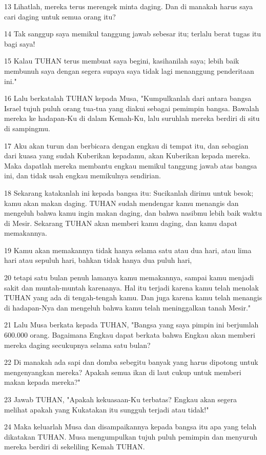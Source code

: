 \par 13 Lihatlah, mereka terus merengek minta daging. Dan di manakah harus saya cari daging untuk semua orang itu?
\par 14 Tak sanggup saya memikul tanggung jawab sebesar itu; terlalu berat tugas itu bagi saya!
\par 15 Kalau TUHAN terus membuat saya begini, kasihanilah saya; lebih baik membunuh saya dengan segera supaya saya tidak lagi menanggung penderitaan ini."
\par 16 Lalu berkatalah TUHAN kepada Musa, "Kumpulkanlah dari antara bangsa Israel tujuh puluh orang tua-tua yang diakui sebagai pemimpin bangsa. Bawalah mereka ke hadapan-Ku di dalam Kemah-Ku, lalu suruhlah mereka berdiri di situ di sampingmu.
\par 17 Aku akan turun dan berbicara dengan engkau di tempat itu, dan sebagian dari kuasa yang sudah Kuberikan kepadamu, akan Kuberikan kepada mereka. Maka dapatlah mereka membantu engkau memikul tanggung jawab atas bangsa ini, dan tidak usah engkau memikulnya sendirian.
\par 18 Sekarang katakanlah ini kepada bangsa itu: Sucikanlah dirimu untuk besok; kamu akan makan daging. TUHAN sudah mendengar kamu menangis dan mengeluh bahwa kamu ingin makan daging, dan bahwa nasibmu lebih baik waktu di Mesir. Sekarang TUHAN akan memberi kamu daging, dan kamu dapat memakannya.
\par 19 Kamu akan memakannya tidak hanya selama satu atau dua hari, atau lima hari atau sepuluh hari, bahkan tidak hanya dua puluh hari,
\par 20 tetapi satu bulan penuh lamanya kamu memakannya, sampai kamu menjadi sakit dan muntah-muntah karenanya. Hal itu terjadi karena kamu telah menolak TUHAN yang ada di tengah-tengah kamu. Dan juga karena kamu telah menangis di hadapan-Nya dan mengeluh bahwa kamu telah meninggalkan tanah Mesir."
\par 21 Lalu Musa berkata kepada TUHAN, "Bangsa yang saya pimpin ini berjumlah 600.000 orang. Bagaimana Engkau dapat berkata bahwa Engkau akan memberi mereka daging secukupnya selama satu bulan?
\par 22 Di manakah ada sapi dan domba sebegitu banyak yang harus dipotong untuk mengenyangkan mereka? Apakah semua ikan di laut cukup untuk memberi makan kepada mereka?"
\par 23 Jawab TUHAN, "Apakah kekuasaan-Ku terbatas? Engkau akan segera melihat apakah yang Kukatakan itu sungguh terjadi atau tidak!"
\par 24 Maka keluarlah Musa dan disampaikannya kepada bangsa itu apa yang telah dikatakan TUHAN. Musa mengumpulkan tujuh puluh pemimpin dan menyuruh mereka berdiri di sekeliling Kemah TUHAN.

